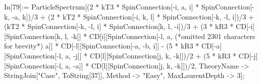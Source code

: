 In[79]:= ParticleSpectrum[(2 * kT3 * SpinConnection[-i, a, i] * SpinConnection[-k, -a, k])/3 + (2 * kT2 * SpinConnection[-i, k, l] * SpinConnection[-k, -l, i])/3 + (kT2 * SpinConnection[-k, -l, i] * SpinConnection[k, l, -i])/3 + (3 * kR3 * CD[-i][SpinConnection[k, l, -k]] * CD[i][SpinConnection[-l, a, (*omitted 2301 characters for brevity*) a]] * CD[-l][SpinConnection[-a, -b, i]] - (5 * kR3 * CD[-a][SpinConnection[-l, a, -j]] * CD[l][SpinConnection[j, k, -k]])/2 + (5 * kR3 * CD[-j][SpinConnection[-l, a, -a]] * CD[l][SpinConnection[j, k, -k]])/2, TheoryName -> StringJoin["Case", ToString[37]], Method -> "Easy", MaxLaurentDepth -> 3];